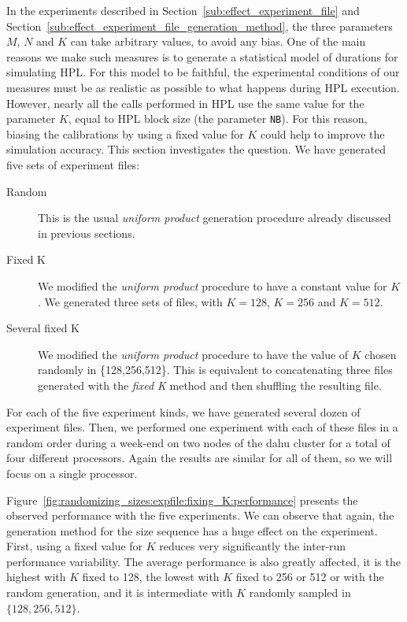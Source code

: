             In the experiments described in Section~\ref{sub:effect_experiment_file} and
            Section~\ref{sub:effect_experiment_file_generation_method}, the three \dgemm parameters \(M\), \(N\) and
            \(K\) can take arbitrary values, to avoid any bias. One of the main reasons we make such measures is to
            generate a statistical model of \dgemm durations for simulating HPL. For this model to be faithful, the
            experimental conditions of our measures must be as realistic as possible to what happens during HPL
            execution. However, nearly all the \dgemm calls performed in HPL use the same value for the parameter \(K\),
            equal to HPL block size (\ie the parameter \texttt{NB}). For this reason, biasing the calibrations by using
            a fixed value for \(K\) could help to improve the simulation accuracy. This section investigates the
            question. We have generated five sets of experiment files:
            \begin{description}
                \item[Random] This is the usual \emph{uniform product} generation procedure already discussed in
                    previous sections.
                \item[Fixed K] We modified the \emph{uniform product} procedure to have a constant value for \(K\). We
                    generated three sets of files, with \(K=128\), \(K=256\) and \(K=512\).
                \item[Several fixed K] We modified the \emph{uniform product} procedure to have the value of \(K\)
                    chosen randomly in \{128,256,512\}. This is equivalent to concatenating three files generated with
                    the \emph{fixed K} method and then shuffling the resulting file.
            \end{description}
            For each of the five experiment kinds, we have generated several dozen of experiment files. Then, we
            performed one experiment with each of these files in a random order during a week-end on two nodes of the
            dahu cluster for a total of four different processors. Again the results are similar for all of them, so we
            will focus on a single processor.

            Figure~\ref{fig:randomizing_sizes:expfile:fixing_K:performance} presents the observed \dgemm performance
            with the five experiments. We can observe that again, the generation method for the size sequence has a huge
            effect on the experiment. First, using a fixed value for \(K\) reduces very significantly the inter-run
            performance variability. The average performance is also greatly affected, it is the highest with \(K\)
            fixed to 128, the lowest with \(K\) fixed to 256 or 512 or with the random generation, and it is
            intermediate with \(K\) randomly sampled in \(\{128,256,512\}\).

